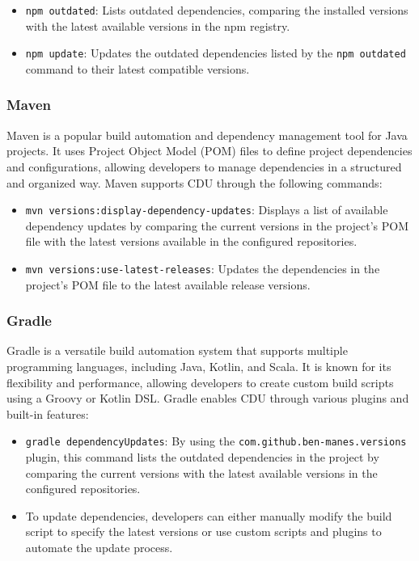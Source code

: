 \documentclass[10pt]{article}
\begin{document}
\begin{itemize}

  \item \texttt{npm outdated}: Lists outdated dependencies, comparing the installed versions with the latest available versions in the npm registry.

  \item \texttt{npm update}: Updates the outdated dependencies listed by the \texttt{npm outdated} command to their latest compatible versions.

\end{itemize}

\subsubsection*{Maven}

Maven is a popular build automation and dependency management tool for Java projects. It uses Project Object Model (POM) files to define project dependencies and configurations, allowing developers to manage dependencies in a structured and organized way. Maven supports CDU through the following commands:

\begin{itemize}

  \item \texttt{mvn versions:display-dependency-updates}: Displays a list of available dependency updates by comparing the current versions in the project's POM file with the latest versions available in the configured repositories.

  \item \texttt{mvn versions:use-latest-releases}: Updates the dependencies in the project's POM file to the latest available release versions.

\end{itemize}

\subsubsection*{Gradle}

Gradle is a versatile build automation system that supports multiple programming languages, including Java, Kotlin, and Scala. It is known for its flexibility and performance, allowing developers to create custom build scripts using a Groovy or Kotlin DSL. Gradle enables CDU through various plugins and built-in features:

\begin{itemize}

  \item \texttt{gradle dependencyUpdates}: By using the \texttt{com.github.ben-manes.versions} plugin, this command lists the outdated dependencies in the project by comparing the current versions with the latest available versions in the configured repositories.

  \item To update dependencies, developers can either manually modify the build script to specify the latest versions or use custom scripts and plugins to automate the update process.

\end{itemize}
\end{document}
